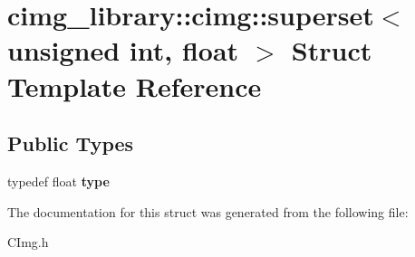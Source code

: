 \hypertarget{structcimg__library_1_1cimg_1_1superset_3_01unsigned_01int_00_01float_01_4}{\section{cimg\-\_\-library\-:\-:cimg\-:\-:superset$<$ unsigned int, float $>$ Struct Template Reference}
\label{structcimg__library_1_1cimg_1_1superset_3_01unsigned_01int_00_01float_01_4}
}
\subsection*{Public Types}
\begin{DoxyCompactItemize}
\item 
\hypertarget{structcimg__library_1_1cimg_1_1superset_3_01unsigned_01int_00_01float_01_4_afb3b276e6aa391f7349d5fa75ac7bdce}{typedef float {\bfseries type}}\label{structcimg__library_1_1cimg_1_1superset_3_01unsigned_01int_00_01float_01_4_afb3b276e6aa391f7349d5fa75ac7bdce}

\end{DoxyCompactItemize}


The documentation for this struct was generated from the following file\-:\begin{DoxyCompactItemize}
\item 
C\-Img.\-h\end{DoxyCompactItemize}

